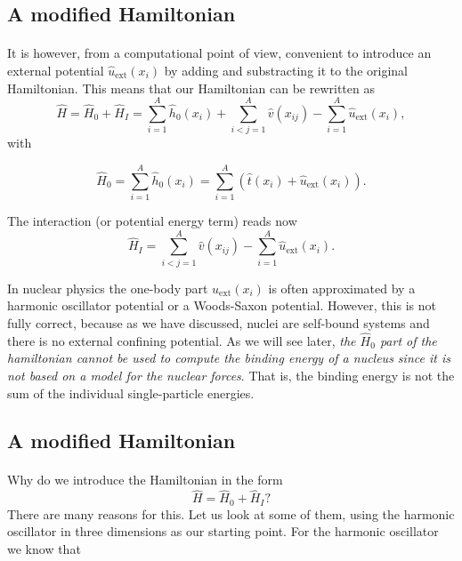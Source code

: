 \documentclass[%
twoside,                 %
final,                   %
10pt]{article}
\begin{document}
\subsection*{A modified Hamiltonian}

\paragraph{}
It is however, from a computational point of view, convenient to introduce an external potential $\hat{u}_{\mathrm{ext}}(x_i)$ by adding and substracting it to the original Hamiltonian. 
This means that our Hamiltonian can be rewritten as 
\[
    \hat{H} = \hat{H}_0 + \hat{H}_I 
    = \sum_{i=1}^A \hat{h}_0(x_i) + \sum_{i < j=1}^A \hat{v}(x_{ij})-\sum_{i=1}^A\hat{u}_{\mathrm{ext}}(x_i),
\]
with

\[
  \hat{H}_0=\sum_{i=1}^A \hat{h}_0(x_i) =  \sum_{i=1}^A\left(\hat{t}(x_i) + \hat{u}_{\mathrm{ext}}(x_i)\right).
\]

The interaction (or potential energy term) reads now
\[
  \hat{H}_I=  \sum_{i < j=1}^A \hat{v}(x_{ij})-\sum_{i=1}^A\hat{u}_{\mathrm{ext}}(x_i).
\]

In nuclear physics the one-body part $u_{\mathrm{ext}}(x_i)$ is often approximated by a harmonic oscillator potential or a
Woods-Saxon potential. However, this is not fully correct, because as we have discussed, nuclei are self-bound systems and there is no external confining potential. As we will see later, \emph{the $\hat{H}_0$ part of the hamiltonian cannot be used to compute the binding energy of a nucleus since it is not based on a model for the nuclear forces}. That is, the binding energy is not the sum of the individual single-particle energies.




\subsection*{A modified Hamiltonian}

\paragraph{}
Why do we introduce the  Hamiltonian  in the form
\[
    \hat{H} = \hat{H}_0 + \hat{H}_I? 
\]
There are many reasons for this. Let us look at some of them, using the harmonic oscillator in three dimensions as our starting point. For the harmonic oscillator we know that
\end{document}

